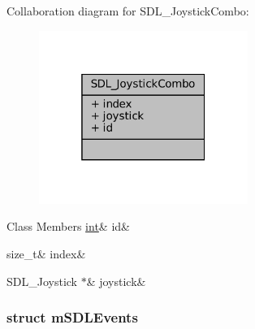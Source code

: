Collaboration diagram for S\+D\+L\+\_\+\+Joystick\+Combo\+:
\nopagebreak
\begin{figure}[H]
\begin{center}
\leavevmode
\includegraphics[width=193pt]{struct_s_d_l___joystick_combo__coll__graph}
\end{center}
\end{figure}
\begin{DoxyFields}{Class Members}
\mbox{\label{sdl-events_8h_a7ea8f71bc838b02d6db86eb84a53a58d}} 
\mbox{\hyperlink{ioapi_8h_a787fa3cf048117ba7123753c1e74fcd6}{int}}&
id&
\\
\hline

\mbox{\label{sdl-events_8h_ae874d0d46f346ac775f5170cb1da3cec}} 
size\_t&
index&
\\
\hline

\mbox{\label{sdl-events_8h_a78aa935a4796aebc47ddcb0361d3a893}} 
SDL\_Joystick $\ast$&
joystick&
\\
\hline

\end{DoxyFields}
\label{structm_s_d_l_events}
\subsubsection{struct m\+S\+D\+L\+Events}


